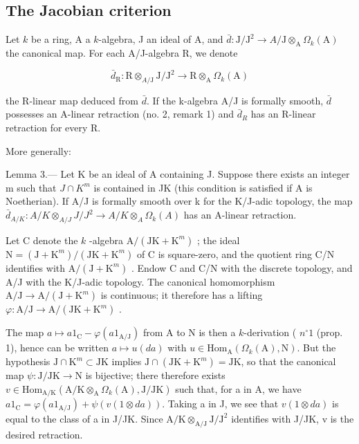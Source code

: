 \subsection{The Jacobian criterion}

Let \(k\) be a ring, A a \(k\)-algebra, J an ideal of A, and \(\bar{d}:\mathrm{J / J^{2}}\to A /\mathrm{J}\otimes_{\mathrm{A}}\Omega_{k}(\mathrm{A})\) the canonical map. For each A/J-algebra R, we denote

\[
\bar {d} _ {\mathrm{R}}: \mathrm{R} \otimes_ {A / \mathrm{J}} \mathrm{J} / \mathrm{J} ^ {2} \longrightarrow \mathrm{R} \otimes_ {\mathrm{A}} \Omega_ {k} (\mathrm{A})
\]

the R-linear map deduced from \(\bar{d}\). If the k-algebra A/J is formally smooth, \(\bar{d}\) possesses an A-linear retraction (no. 2, remark 1) and \(\bar{d}_{R}\) has an R-linear retraction for every R.

More generally:

Lemma 3.--- Let K be an ideal of A containing J. Suppose there exists an integer m such that \(J \cap K^{m}\) is contained in JK (this condition is satisfied if A is Noetherian). If A/J is formally smooth over k for the K/J-adic topology, the map \(\bar{d}_{A/K}: A/K \otimes_{A/J} J/J^{2} \longrightarrow A/K \otimes_{A} \Omega_{k}(A)\) has an A-linear retraction.

Let C denote the \(k\) -algebra \(\mathrm{A} / (\mathrm{JK} + \mathrm{K}^m)\) ; the ideal \(\mathrm{N} = (\mathrm{J} + \mathrm{K}^m) / (\mathrm{JK} + \mathrm{K}^m)\) of C is square-zero, and the quotient ring C/N identifies with \(\mathrm{A} / (\mathrm{J} + \mathrm{K}^m)\) . Endow C and C/N with the discrete topology, and A/J with the K/J-adic topology. The canonical homomorphism \(\mathrm{A} / \mathrm{J} \to \mathrm{A} / (\mathrm{J} + \mathrm{K}^m)\) is continuous; it therefore has a lifting \(\varphi : \mathrm{A} / \mathrm{J} \to \mathrm{A} / (\mathrm{JK} + \mathrm{K}^m)\) .

The map \(a \mapsto a1_{\mathrm{C}} - \varphi(a1_{\mathrm{A/J}})\) from A to N is then a \(k\)-derivation ( \(n^{\circ} 1\) (prop. 1), hence can be written \(a \mapsto u(da)\) with \(u \in \mathrm{Hom}_{\mathrm{A}}(\Omega_k(\mathrm{A}), \mathrm{N})\). But the hypothesis \(\mathrm{J} \cap \mathrm{K}^m \subset \mathrm{JK}\) implies \(\mathrm{J} \cap (\mathrm{JK} + \mathrm{K}^m) = \mathrm{JK}\), so that the canonical map \(\psi: \mathrm{J/JK} \to \mathrm{N}\) is bijective; there therefore exists \(v \in \mathrm{Hom}_{\mathrm{A/K}}(\mathrm{A/K} \otimes_{\mathrm{A}} \Omega_k(\mathrm{A}), \mathrm{J/JK})\) such that, for a in A, we have \(a1_{\mathrm{C}} = \varphi(a1_{\mathrm{A/J}}) + \psi(v(1 \otimes da))\). Taking a in J, we see that \(v(1 \otimes da)\) is equal to the class of a in J/JK. Since \(\mathrm{A/K} \otimes_{\mathrm{A/J}} \mathrm{J/J}^2\) identifies with J/JK, v is the desired retraction.

